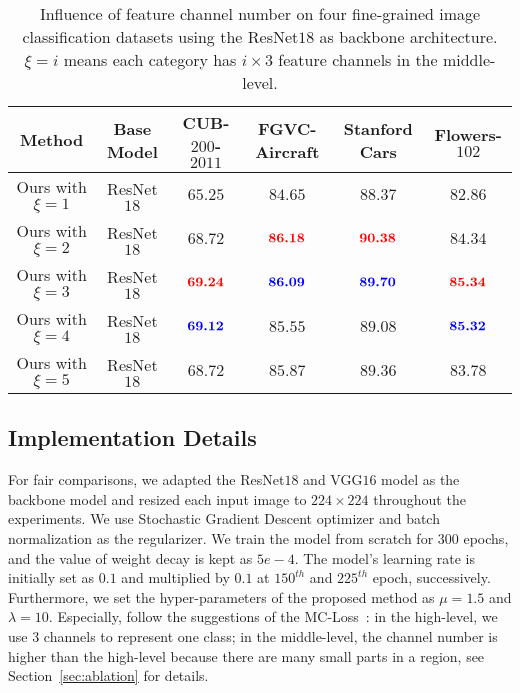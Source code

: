 \documentclass[journal]{IEEEtran}
\def\tblue#1{\textcolor[rgb]{0,0,1}{#1}} %
\def\tred#1{\textcolor[rgb]{1,0,0}{#1}}  %
\begin{document}
\begin{table*}[!t]
  \centering
  \small
  \caption{Influence of feature channel number on four fine-grained image classification datasets using the ResNet$18$ as backbone architecture. $\xi =i$ means each category has $i \times 3$ feature channels in the middle-level.}
  \begin{adjustbox}{width=0.8\linewidth,center}
   \Huge   %
    \begin{tabular}{|c|c|c|c|c|c|}
    \toprule
    Method     & Base Model             & CUB-$200$-$2011$   & FGVC-Aircraft      & Stanford Cars     & Flowers-$102$ \\
    \midrule
    \midrule
    Ours with $\xi =1$ & ResNet$18$ & $65.25$        & $84.65$        & $88.37$        & $82.86$ \\
    Ours with $\xi =2$ & ResNet$18$ & $68.72$        & $\textbf{\tred{86.18}}$ & $\textbf{\tred{90.38}}$ & $84.34$ \\
    Ours with $\xi =3$ & ResNet$18$ & $\textbf{\tred{69.24}}$& $\textbf{\tblue{86.09}}$& $\textbf{\tblue{89.70}}$& $\textbf{\tred{85.34}}$ \\
    Ours with $\xi =4$ & ResNet$18$ & $\textbf{\tblue{69.12}}$ & $85.55$        & $89.08$        & $\textbf{\tblue{85.32}}$ \\
    Ours with $\xi =5$ & ResNet$18$ & $68.72$        & $85.87$        & $89.36$        & $83.78$ \\



    \bottomrule
    \end{tabular}%
  \end{adjustbox}
  \label{tab:ablation_3}%
\end{table*}%


\subsection{Implementation Details}\label{sec:Details}

For fair comparisons, we adapted the ResNet$18$ and VGG$16$ model as the backbone model and resized each input image to $224\times224$ throughout the experiments.  We use Stochastic Gradient Descent optimizer and batch normalization as the regularizer. We train the model from scratch for $300$ epochs, and the value of weight decay is kept as $5e-4$. The model's learning rate is initially set as $0.1$ and multiplied by $0.1$ at $150^{th}$ and $225^{th}$ epoch, successively. Furthermore, we set the hyper-parameters of the proposed method as $\mu = 1.5$ and $\lambda = 10$. Especially, follow the suggestions of the MC-Loss~\cite{chang2020mc}: in the high-level, we use $3$ channels to represent one class; in the middle-level, the channel number is higher than the high-level because there are many small parts in a region, see Section~\ref{sec:ablation} for details.
\end{document}
